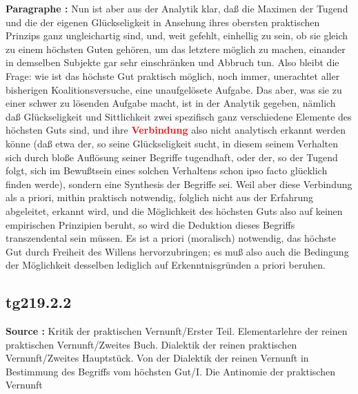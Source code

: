 \documentclass[a4paper,12pt,twoside]{book}
\newcommand{\match}[1]{\textcolor{red}{\textbf{#1}}}
\begin{document}
	\noindent\textbf{Paragraphe : }Nun ist aber aus der Analytik klar, daß die Maximen der Tugend und die der eigenen Glückseligkeit in Ansehung ihres obersten praktischen Prinzips ganz ungleichartig sind, und, weit gefehlt, einhellig zu sein, ob sie gleich zu einem höchsten Guten gehören, um das letztere möglich zu machen, einander in demselben Subjekte gar sehr einschränken und Abbruch tun. Also bleibt die Frage: wie ist das höchste Gut praktisch möglich, noch immer, unerachtet aller bisherigen Koalitionsversuche, eine unaufgelösete Aufgabe. Das aber, was sie zu einer schwer zu lösenden Aufgabe macht, ist in der Analytik gegeben, nämlich daß Glückseligkeit und Sittlichkeit zwei spezifisch ganz verschiedene Elemente des höchsten Guts sind, und ihre \match{Verbindung} also nicht analytisch erkannt werden könne (daß etwa der, so seine Glückseligkeit sucht, in diesem seinem Verhalten sich durch bloße Auflösung seiner Begriffe tugendhaft, oder der, so der Tugend folgt, sich im Bewußtsein eines solchen Verhaltens schon ipso facto glücklich finden werde), sondern eine Synthesis der Begriffe sei. Weil aber diese Verbindung als a priori, mithin praktisch notwendig, folglich nicht aus der Erfahrung abgeleitet, erkannt wird, und die Möglichkeit des höchsten Guts also auf keinen empirischen Prinzipien beruht, so wird die Deduktion dieses Begriffs transzendental sein müssen. Es ist a priori (moralisch) notwendig, das höchste Gut durch Freiheit des Willens hervorzubringen; es muß also auch die Bedingung der Möglichkeit desselben lediglich auf Erkenntnisgründen a priori beruhen. 
	
	\subsection*{tg219.2.2} 
	\textbf{Source : }Kritik der praktischen Vernunft/Erster Teil. Elementarlehre der reinen praktischen Vernunft/Zweites Buch. Dialektik der reinen praktischen Vernunft/Zweites Hauptstück. Von der Dialektik der reinen Vernunft in Bestimmung des Begriffs vom höchsten Gut/I. Die Antinomie der praktischen Vernunft\\  
	
\end{document}
